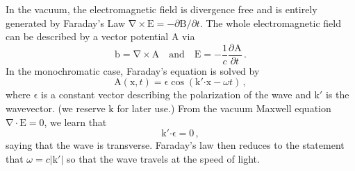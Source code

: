 \documentclass{article}
\theoremstyle{plain}\theoremheaderfont{\normalfont\itshape}\theorembodyfont{\rmfamily}\theoremseparator{.}\newtheorem*{rem}{Remark}\newtheorem*{ex}{Example}\newtheorem*{proof}{Proof}\newtheorem*{altp}{Alternative proof}
\theoremstyle{plain}\theoremheaderfont{\normalfont\bfseries}\theorembodyfont{\rmfamily}\theoremseparator{.}\newtheorem{thm}{Theorem}[section]\newtheorem{lem}[thm]{Lemma}\newtheorem{prop}[thm]{Proposition}\newtheorem*{cor}{Corollary}\newtheorem{defn}[thm]{Definition}\newtheorem{clm}[thm]{Claim}\newtheorem{clminproof}{Claim}
\theoremstyle{break}\theoremheaderfont{\normalfont\itshape}\theorembodyfont{\rmfamily}\theoremseparator{.\medskip}\newtheorem*{proofskip}{Proof}\newtheorem*{exs}{Examples}\newtheorem*{rems}{Remarks}
\theoremstyle{break}\theoremheaderfont{\normalfont\bfseries}\theorembodyfont{\rmfamily}\theoremseparator{.\medskip}\newtheorem{lemskip}[thm]{Lemma}\newtheorem{defnskip}[thm]{Definition}\newtheorem{propskip}[thm]{Proposition}\newtheorem{thmskip}[thm]{Theorem}
\numberwithin{equation}{section}
\newcommand{\pdv}[3][]{\frac{\partial^{#1} #2}{{\partial #3}^{#1}}}
\newcommand{\vb}[1]{\bm{\mathrm{#1}}}
\newcommand{\vdot}{\bm{\cdot}}
\newcommand{\abs}[1]{\left| #1 \right|}
\renewcommand{\div}{\vb{\nabla}\cdot}
\newcommand{\curl}{\vb{\nabla}\times}
\begin{document}
    In the vacuum, the electromagnetic field is divergence free and is entirely generated by Faraday's Law \(\curl\vb{E}=-\partial\vb{B}/\partial t\). The whole electromagnetic field can be described by a vector potential \(\vb{A}\) via
    \begin{equation}
        \vb{b}=\curl\vb{A}\quad\text{and}\quad\vb{E}=-\frac{1}{c}\pdv{\vb{A}}{t}\,.
    \end{equation}
    In the monochromatic case, Faraday's equation is solved by
    \begin{equation}
        \vb{A}(\vb{x},t)=\vb{\epsilon}\cos(\vb{k}'\vdot\vb{x}-\omega t)\,,
    \end{equation}
    where \(\vb{\epsilon}\) is a constant vector describing the polarization of the wave and \(\vb{k}'\) is the wavevector. (we reserve \(\vb{k}\) for later use.) From the vacuum Maxwell equation \(\div\vb{E}=0\), we learn that
    \begin{equation}\label{transverse}
        \vb{k}'\vdot\vb{\epsilon}=0\,,
    \end{equation}
    saying that the wave is transverse. Faraday's law then reduces to the statement that \(\omega=c\abs{\vb{k}'}\) so that the wave travels at the speed of light.
\end{document}
